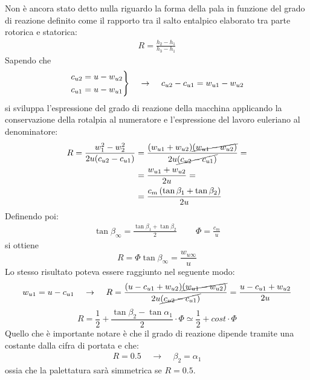 Non è ancora stato detto nulla riguardo la forma della pala in funzione del grado di reazione definito come il rapporto tra il salto entalpico elaborato tra parte rotorica e statorica:
\begin{align*}
R = \frac{h_2 - h_1}{h_3-h_1} 
\end{align*}
Sapendo che
\begin{align*}
\begin{rcases*}
c_{u2} = u - w_{u2}\\
c_{u1} = u - w_{u1}
\end{rcases*}
\;\;\;\; \rightarrow \;\;\;\; c_{u2} - c_{u1} = w_{u1} - w_{u2} 
\end{align*}
si sviluppa l'espressione del grado di reazione della macchina applicando la conservazione della rotalpia al numeratore e l'espressione del lavoro euleriano al denominatore:
\begin{align*}
R = \frac{w_1^2 - w_2^2}{2 u (c_{u2} - c_{u1})} &= \frac{(w_{u1} + w_{u2})\cancel{(w_{u1}-w_{u2})}}{2 u \cancel{(c_{u2} - c_{u1})}} =\\
&= \frac{w_{u1} + w_{u2}}{2u} = \\
&= \frac{c_m \left(\tan \beta_1 + \tan \beta_2 \right)}{2 u}
\end{align*}
Definendo poi:
	\begin{align*}
	\tan \beta_{\infty} = \frac{\tan \beta_1 + \tan \beta_2}{2} \;\;\;\;\;\;\;\; \Phi = \frac{c_m}{u}
	\end{align*}
si ottiene
\begin{equation}
\boxed{R = \Phi \tan \beta_{\infty} = \frac{w_{u \infty}}{u}}
\end{equation}
Lo stesso risultato poteva essere raggiunto nel seguente modo:
\begin{align*}
	w_{u1} = u - c_{u1} \;\;\;\; \rightarrow \;\;\;\; R =\frac{(u-c_{u1}+w_{u2})\cancel{(w_{u1}-w_{u2})}}{2 u \cancel{(c_{u2} - c_{u1})}}=\frac{u-c_{u1}+w_{u2}}{2u}
\end{align*}
\begin{equation}
R = \frac{1}{2} + \frac{\tan \beta_2 - \tan \alpha_1}{2} \cdot \Phi \simeq \frac{1}{2} + cost \cdot \Phi
\end{equation}
Quello che è importante notare è che il grado di reazione dipende tramite una costante dalla cifra di portata e che:
\begin{align*}
R = 0.5 \;\;\;\; \to \;\;\;\; \beta_2 = \alpha_1
\end{align*}
ossia che la palettatura sarà simmetrica se $R=0.5$.

